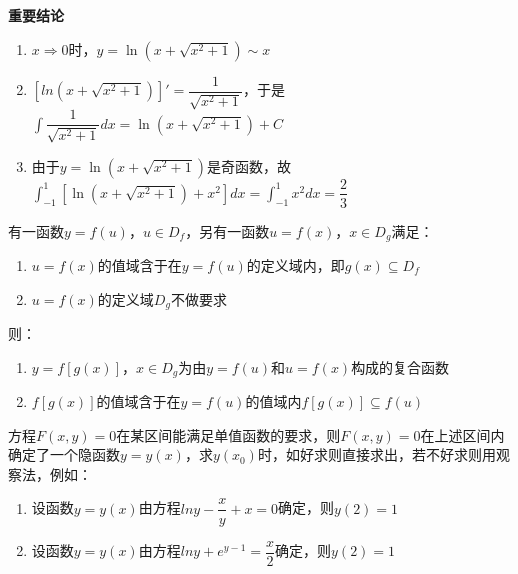 \documentclass{ctexart}
\begin{document}
\begin{example}[3个双曲函数]
\begin{center}
    \end{center}
    \textbf{重要结论}
    \begin{enumerate}
        \item $x\Rightarrow0$时，$y=\ln(x+\sqrt{x^2+1}) \sim x$
        \item $[ln(x+\sqrt{x^2+1})]'=\dfrac{1}{\sqrt{x^2+1}}$，于是$\int \dfrac{1}{\sqrt{x^2+1}}dx=\ln(x+\sqrt{x^2+1})+C$
        \item 由于$y=\ln(x+\sqrt{x^2+1})$是奇函数，故$\int_{-1}^1[\ln(x+\sqrt{x^2+1})+x^2]dx=\int_{-1}^1x^2dx=\dfrac{2}{3}$
    \end{enumerate}
\end{example}

\begin{definition}[复合函数]
    有一函数$y=f(u)$，$u \in D_f$，另有一函数$u=f(x)$，$x \in D_g$满足：
    \begin{enumerate}
        \item $u=f(x)$的值域含于在$y=f(u)$的定义域内，即$g(x) \subseteq D_f$
        \item $u=f(x)$的定义域$D_g$不做要求
    \end{enumerate}
    则：
    \begin{enumerate}
        \item $y=f[g(x)]$，$x \in D_g$为由$y=f(u)$和$u=f(x)$构成的复合函数
        \item $f[g(x)]$的值域含于在$y=f(u)$的值域内$f[g(x)]\subseteq f(u)$
    \end{enumerate}
\end{definition}

\begin{example}[隐函数]
    方程$F(x,y)=0$在某区间能满足单值函数的要求，则$F(x,y)=0$在上述区间内确定了一个隐函数$y=y(x)$，求$y(x_0)$时，如好求则直接求出，若不好求则用观察法，例如：
    \begin{enumerate}
        \item 设函数$y=y(x)$由方程$lny-\dfrac{x}{y}+x=0$确定，则$y(2)=1$
        \item 设函数$y=y(x)$由方程$lny+e^{y-1}=\dfrac{x}{2}$确定，则$y(2)=1$
    \end{enumerate}
\end{example}
\end{document}
